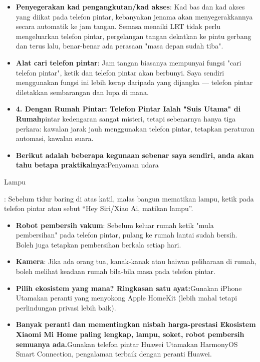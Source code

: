 \begin{itemize}
  \item \textbf{Penyegerakan kad pengangkutan/kad akses}: Kad bas dan kad akses yang diikat pada telefon pintar, kebanyakan jenama akan menyegerakkannya secara automatik ke jam tangan. Semasa menaiki LRT tidak perlu mengeluarkan telefon pintar, pergelangan tangan dekatkan ke pintu gerbang dan terus lalu, benar-benar ada perasaan "masa depan sudah tiba".
  \item \textbf{Alat cari telefon pintar}: Jam tangan biasanya mempunyai fungsi "cari telefon pintar", ketik dan telefon pintar akan berbunyi. Saya sendiri menggunakan fungsi ini lebih kerap daripada yang dijangka — telefon pintar diletakkan sembarangan dan lupa di mana.
  \item \textbf{4. Dengan Rumah Pintar: Telefon Pintar Ialah "Suis Utama" di Rumah}pintar kedengaran sangat misteri, tetapi sebenarnya hanya tiga perkara: kawalan jarak jauh menggunakan telefon pintar, tetapkan peraturan automasi, kawalan suara.
  \item \textbf{Berikut adalah beberapa kegunaan sebenar saya sendiri, anda akan tahu betapa praktikalnya:}Penyaman udara
\end{itemize}


Lampu

: Sebelum tidur baring di atas katil, malas bangun mematikan lampu, ketik pada telefon pintar atau sebut “Hey Siri/Xiao Ai, matikan lampu”.

\begin{itemize}
  \item \textbf{Robot pembersih vakum}: Sebelum keluar rumah ketik "mula pembersihan" pada telefon pintar, pulang ke rumah lantai sudah bersih. Boleh juga tetapkan pembersihan berkala setiap hari.
  \item \textbf{Kamera}: Jika ada orang tua, kanak-kanak atau haiwan peliharaan di rumah, boleh melihat keadaan rumah bila-bila masa pada telefon pintar.
  \item \textbf{Pilih ekosistem yang mana? Ringkasan satu ayat:}Gunakan iPhone Utamakan peranti yang menyokong Apple HomeKit (lebih mahal tetapi perlindungan privasi lebih baik).
  \item \textbf{Banyak peranti dan mementingkan nisbah harga-prestasi Ekosistem Xiaomi Mi Home paling lengkap, lampu, soket, robot pembersih semuanya ada.}Gunakan telefon pintar Huawei Utamakan HarmonyOS Smart Connection, pengalaman terbaik dengan peranti Huawei.
\end{itemize}

